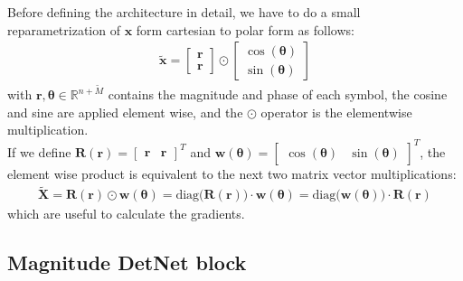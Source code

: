 Before defining the architecture in detail, we have to do a small reparametrization of $\bm x$ form cartesian to polar form as follows:
\begin{align}
	\tilde{\bm x}=\begin{bmatrix}\bm{r}\\\bm r\end{bmatrix}\odot\begin{bmatrix}\cos(\bm{\theta})\\\sin(\bm{\theta})\end{bmatrix}
\end{align}
with $\bm r,\bm\theta \in \mathds{R}^{n+\widetilde{M}}$ contains the magnitude and phase of each symbol, the cosine and sine are applied element wise, and the $\odot$ operator is the elementwise multiplication.\\

If we define $\bm R(\bm{r})= \begin{bmatrix}\bm{r}&\bm r\end{bmatrix}^T$ and $\bm w(\bm\theta)=\begin{bmatrix}\cos(\bm{\theta})&\sin(\bm{\theta})\end{bmatrix}^T$, the element wise product is equivalent to the next two matrix vector multiplications:
\begin{align}
	\bm\tilde{X}=\bm R(\bm{r})\odot\bm w(\bm\theta)
	=\text{diag}\bigl(\bm R(\bm{r})\bigr)\cdot \bm w(\bm\theta)
	=\text{diag}\bigl(\bm w(\bm\theta)\bigr)\cdot\bm R(\bm{r})
\end{align}
which are useful to calculate the gradients.


\subsection{Magnitude DetNet block}

